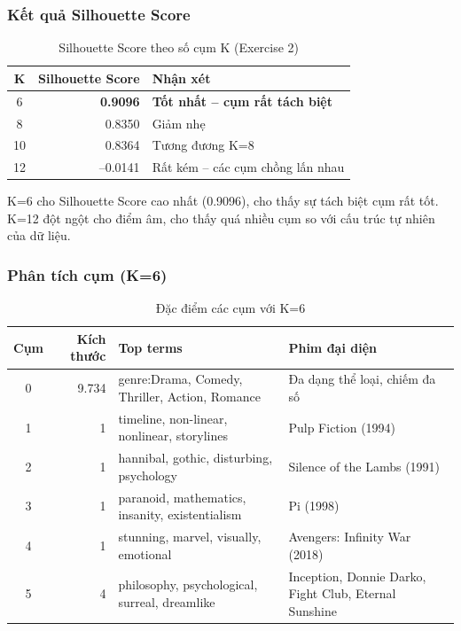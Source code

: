 \subsubsection{Kết quả Silhouette Score}

\begin{table}[h]
\centering
\begin{tabular}{|c|r|l|}
\hline
\textbf{K} & \textbf{Silhouette Score} & \textbf{Nhận xét} \\
\hline
6  & \textbf{0.9096} & \textbf{Tốt nhất -- cụm rất tách biệt} \\
\hline
8  & 0.8350 & Giảm nhẹ \\
\hline
10 & 0.8364 & Tương đương K=8 \\
\hline
12 & --0.0141 & Rất kém -- các cụm chồng lấn nhau \\
\hline
\end{tabular}
\caption{Silhouette Score theo số cụm K (Exercise 2)}
\end{table}

K=6 cho Silhouette Score cao nhất (0.9096), cho thấy sự tách biệt cụm rất tốt. K=12 đột ngột cho điểm âm, cho thấy quá nhiều cụm so với cấu trúc tự nhiên của dữ liệu.

\subsubsection{Phân tích cụm (K=6)}

\begin{table}[h]
\centering
\begin{tabular}{|c|r|p{4.5cm}|p{4.5cm}|}
\hline
\textbf{Cụm} & \textbf{Kích thước} & \textbf{Top terms} & \textbf{Phim đại diện} \\
\hline
0 & 9.734 & genre:Drama, Comedy, Thriller, Action, Romance & Đa dạng thể loại, chiếm đa số \\
\hline
1 & 1 & timeline, non-linear, nonlinear, storylines & Pulp Fiction (1994) \\
\hline
2 & 1 & hannibal, gothic, disturbing, psychology & Silence of the Lambs (1991) \\
\hline
3 & 1 & paranoid, mathematics, insanity, existentialism & Pi (1998) \\
\hline
4 & 1 & stunning, marvel, visually, emotional & Avengers: Infinity War (2018) \\
\hline
5 & 4 & philosophy, psychological, surreal, dreamlike & Inception, Donnie Darko, Fight Club, Eternal Sunshine \\
\hline
\end{tabular}
\caption{Đặc điểm các cụm với K=6}
\end{table}

